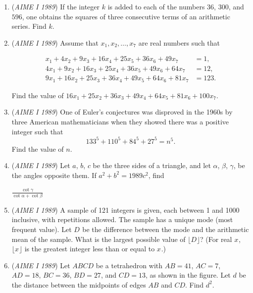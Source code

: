 \begin{enumerate}
	\item (\textit{AIME I 1989}) If the integer $k$ is added to each of the numbers $36$, $300$, and $596$, one obtains the squares of three consecutive terms of an arithmetic series. Find $k$.


 

	\item (\textit{AIME I 1989}) Assume that $x_1,x_2,\ldots,x_7$ are real numbers such that

 \begin{align*} x_1 + 4x_2 + 9x_3 + 16x_4 + 25x_5 + 36x_6 + 49x_7 &= 1, \\ 4x_1 + 9x_2 + 16x_3 + 25x_4 + 36x_5 + 49x_6 + 64x_7 &= 12, \\ 9x_1 + 16x_2 + 25x_3 + 36x_4 + 49x_5 + 64x_6 + 81x_7 &= 123. \end{align*}

Find the value of $16x_1+25x_2+36x_3+49x_4+64x_5+81x_6+100x_7$.


 

	\item (\textit{AIME I 1989}) One of Euler's conjectures was disproved in the 1960s by three American mathematicians when they showed there was a positive integer such that 
 \[133^5+110^5+84^5+27^5=n^{5}.\] Find the value of $n$.


 

	\item (\textit{AIME I 1989}) Let $a$, $b$, $c$ be the three sides of a triangle, and let $\alpha$, $\beta$, $\gamma$, be the angles opposite them. If $a^2+b^2=1989c^2$, find


 $\frac{\cot \gamma}{\cot \alpha+\cot \beta}$


	\item (\textit{AIME I 1989}) A sample of 121 integers is given, each between 1 and 1000 inclusive, with repetitions allowed. The sample has a unique mode (most frequent value). Let $D^{}_{}$ be the difference between the mode and the arithmetic mean of the sample. What is the largest possible value of $\lfloor D^{}_{}\rfloor$? (For real $x^{}_{}$, $\lfloor x^{}_{}\rfloor$ is the greatest integer less than or equal to $x^{}_{}$.)


 

	\item (\textit{AIME I 1989}) Let $ABCD$ be a tetrahedron with $AB=41$, $AC=7$, $AD=18$, $BC=36$, $BD=27$, and $CD=13$, as shown in the figure. Let $d$ be the distance between the midpoints of edges $AB$ and $CD$. Find $d^{2}$.



\end{enumerate}

